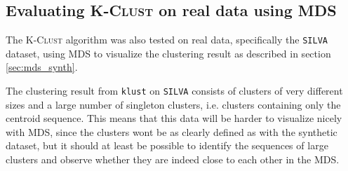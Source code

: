

\subsection{Evaluating \textsc{K-Clust} on real data using MDS}

The \textsc{K-Clust} algorithm was also tested on real data, specifically the
\texttt{SILVA} dataset, using MDS to visualize the clustering result as
described in section \ref{sec:mds_synth}.

The clustering result from \texttt{klust} on \texttt{SILVA} consists of
clusters of very different sizes and a large number of singleton clusters, i.e.
clusters containing only the centroid sequence. This means that this data will
be harder to visualize nicely with MDS, since the clusters wont be as clearly
defined as with the synthetic dataset, but it should at least be possible to
identify the sequences of large clusters and observe whether they are indeed
close to each other in the MDS.

